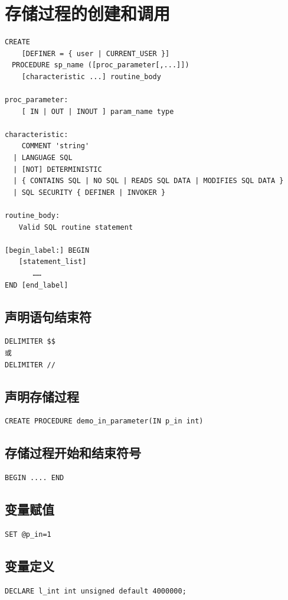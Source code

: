 \documentclass[UTF8,a4paper,12pt]{ctexbook}
\begin{document}
	\section{存储过程的创建和调用}
		\begin{lstlisting}
CREATE
    [DEFINER = { user | CURRENT_USER }]
　PROCEDURE sp_name ([proc_parameter[,...]])
    [characteristic ...] routine_body
 
proc_parameter:
    [ IN | OUT | INOUT ] param_name type
 
characteristic:
    COMMENT 'string'
  | LANGUAGE SQL
  | [NOT] DETERMINISTIC
  | { CONTAINS SQL | NO SQL | READS SQL DATA | MODIFIES SQL DATA }
  | SQL SECURITY { DEFINER | INVOKER }
 
routine_body:
　　Valid SQL routine statement
 
[begin_label:] BEGIN
　　[statement_list]
　　　　……
END [end_label]		
		\end{lstlisting}
	
	
		\subsection{声明语句结束符}
			\begin{lstlisting}
DELIMITER $$
或
DELIMITER //			
			\end{lstlisting}
		
		\subsection{声明存储过程}
			\begin{lstlisting}
CREATE PROCEDURE demo_in_parameter(IN p_in int)       			
			\end{lstlisting}		
		
		\subsection{存储过程开始和结束符号}
			\begin{lstlisting}
BEGIN .... END  			
			\end{lstlisting}
		
		\subsection{变量赋值}
			\begin{lstlisting}
SET @p_in=1  			
			\end{lstlisting}
		
		\subsection{变量定义}		
			\begin{lstlisting}
DECLARE l_int int unsigned default 4000000; 			
			\end{lstlisting}
			
\end{document}
